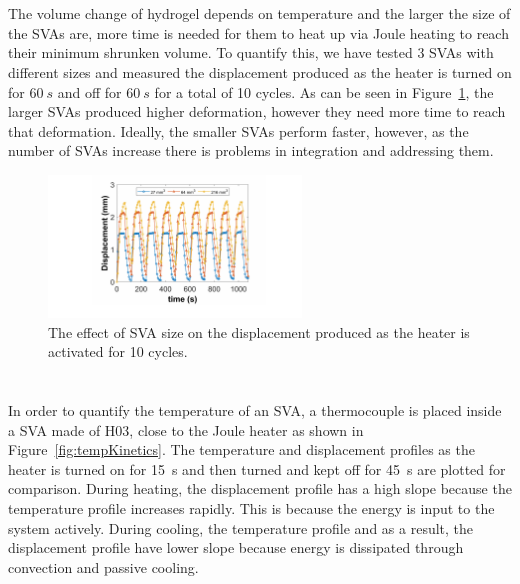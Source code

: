 \section{}
The volume change of hydrogel depends on temperature and the larger the size of the SVAs are, more time is needed for them to heat up via Joule heating to reach their minimum shrunken volume. To quantify this, we have tested 3 SVAs with different sizes and measured the displacement produced as the heater is turned on for $60~s$ and off for $60~s$ for a total of 10 cycles. As can be seen in Figure~\ref{fig:svaSize}, the larger SVAs produced higher deformation, however they need more time to reach that deformation. Ideally, the smaller SVAs perform faster, however, as the number of SVAs increase there is problems in integration and addressing them.
\begin{figure}[!htb]
      \centering
      \includegraphics[width=0.6\textwidth]{svaSize.pdf}
      \caption[]{The effect of SVA size on the displacement produced as the heater is activated for 10 cycles.}
      \label{fig:svaSize}
\end{figure}

\section{} 
In order to quantify the temperature of an SVA, a thermocouple is placed inside a SVA made of H03, close to the Joule heater as shown in Figure~\ref{fig:tempKinetics}. The temperature and displacement profiles as the heater is turned on for 15~s and then turned and kept off for 45~s are plotted for comparison. During heating, the displacement profile has a high slope because the temperature profile increases rapidly. This is because the energy is input to the system actively. During cooling, the temperature profile and as a result, the displacement profile have lower slope because energy is dissipated through convection and passive cooling.		

